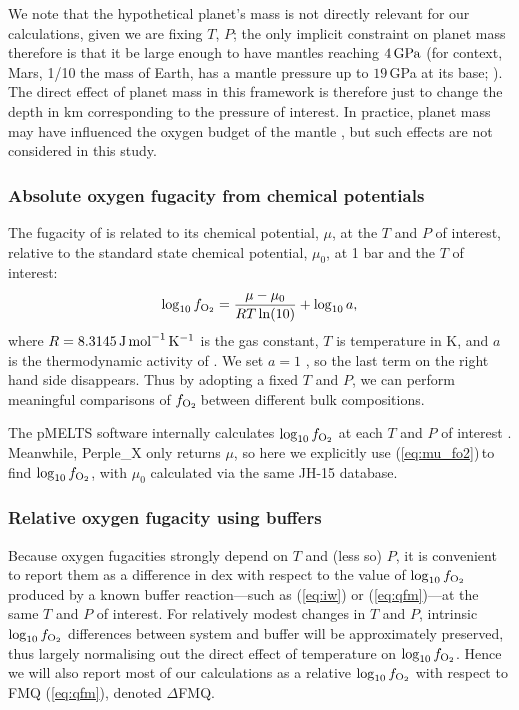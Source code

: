 \documentclass[fleqn,usenatbib,twocolumn]{mnras}
\newcommand{\fo}{$f_{\ce{O2}}$}
\begin{document}
We note that the hypothetical planet's mass is not directly relevant for our calculations, given we are fixing $T$, $P$; the only implicit constraint on planet mass therefore is that it be large enough to have mantles reaching $4\,{\rm GPa}$ (for context, Mars, 1/10 the mass of Earth, has a mantle pressure up to $19\,$GPa at its base; \citealt{stahler_seismic_2021}).  The direct effect of planet mass in this framework is therefore just to change the depth in km corresponding to the pressure of interest. In practice, planet mass may have influenced the oxygen budget of the mantle \citep[e.g.,][]{frost_redox_2008}, but such effects are not considered in this study.

\subsubsection{Absolute oxygen fugacity from chemical potentials}

The fugacity of  is related to its chemical potential, $\mu$, at the $T$ and $P$ of interest, relative to the standard state chemical potential, $\mu_0$, at 1 bar and the $T$ of interest:
\begin{equation}\label{eq:mu_fo2}
\log_{10} f_{\ce{O2}}= \frac{\mu - \mu_0} { R T \ln(10) } + \log_{10}a,
\end{equation}
where $R = 8.3145\,{\rm J\, mol}^{-1}\,{\rm K}^{-1}$ is the gas constant, $T$ is temperature in K, and $a$ is the thermodynamic activity of . We set $a = 1$ \citep{stolper_effects_2020}, so the last term on the right hand side disappears. Thus by adopting a fixed $T$ and $P$, we can perform meaningful comparisons of \fo\,between different bulk compositions.  

The pMELTS software internally calculates $\log_{10} f_{\ce{O2}}$ at each $T$ and $P$ of interest \citep[see][]{asimow_algorithmic_1998}. Meanwhile, Perple\_X only returns $\mu$, so here we explicitly use (\ref{eq:mu_fo2})\,to find $\log_{10} f_{\ce{O2}}$, with $\mu_0$ calculated via the same JH-15 database.


\subsubsection{Relative oxygen fugacity using buffers}

Because oxygen fugacities strongly depend on $T$ and (less so) $P$, it is convenient to report them as a difference in dex with respect to the value of $\log_{10} f_{\ce{O2}}$ produced by a known buffer reaction---such as (\ref{eq:iw}) or (\ref{eq:qfm})---at the same $T$ and $P$ of interest. For relatively modest changes in $T$ and $P$, intrinsic $\log_{10} f_{\ce{O2}}$ differences between system and buffer will be approximately preserved, thus largely normalising out the direct effect of temperature on $\log_{10} f_{\ce{O2}}$. 
Hence we will also report most of our calculations as a relative $\log_{10} f_{\ce{O2}}$ with respect to FMQ (\ref{eq:qfm}), denoted $\Delta$FMQ. 
\end{document}
